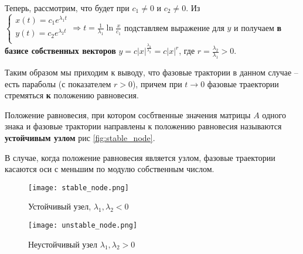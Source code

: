 \documentclass[a4paper, 12pt]{article}
\begin{document}
\begin{enumerate}
\begin{enumerate}
        Теперь, рассмотрим, что будет при $c_1 \neq 0$ и $c_2 \neq 0$. Из 
        $\displaystyle 
        \begin{cases}
          x(t) = c_1 e^{\lambda_1 t} \\
          y(t) = c_2 e^{\lambda_2 t} \\
        \end{cases} \Rightarrow t = \frac{1}{\lambda_1} \ln{\frac{x}{c_1}}$ подставляем выражение для $y$ и получаем \textbf{в базисе собственных векторов} $\displaystyle y = c |x|^{\frac{\lambda_2}{\lambda_2}} = c |x|^r$, где $\displaystyle r = \frac{\lambda_2}{\lambda_1} > 0$.

        Таким образом мы приходим к выводу, что фазовые трактории в данном случае -- есть параболы (с показателем $r > 0$), причем при $t \rightarrow 0$ фазовые траектории стремяться \textbf{к} положению равновесия.

        \begin{definition}
          Положение равновесия, при котором сосбтвенные значения матрицы $A$ одного знака и фазовые трактории направлены к положению равновесия называются \textbf{устойчивым узлом} рис \ref{fig:stable_node}.
        \end{definition}

        \begin{remark}
          В случае, когда положение равновесия является узлом, фазовые траектории касаются оси с меньшим по модулю собственным числом.
        \end{remark}

        \begin{figure}[h!]
          \begin{center}
              \begin{minipage}[h!]{0.48\linewidth}
                  \texttt{[image: stable\_node.png]}
                  \caption{Устойчивый узел, $\lambda_1, \lambda_2 < 0$}
                  \label{fig:stable_node}
              \end{minipage}
              \hfill
              \begin{minipage}[h!]{0.48\linewidth}
                  \texttt{[image: unstable\_node.png]}
                  \caption{Неустойчивый узел $\lambda_1, \lambda_2 > 0$}
                  \label{fig:unstable_node}
              \end{minipage}
          \end{center}
        \end{figure}


\end{enumerate}
\end{enumerate}
\end{document}
